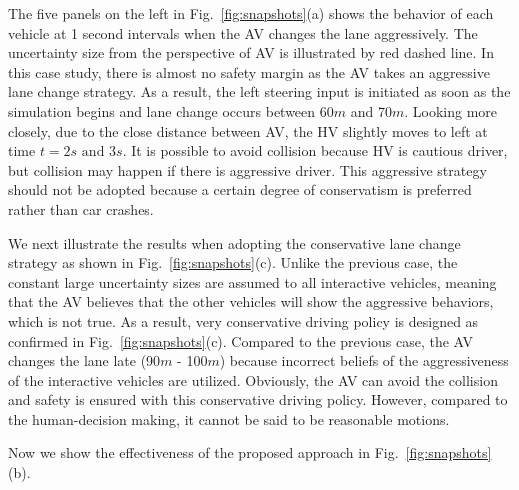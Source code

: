 \documentclass[10pt,journal]{IEEEtran}
\begin{document}
	The five panels on the left in Fig.~\ref{fig:snapshots}(a) shows the behavior of each vehicle at 1 second intervals when the AV changes the lane aggressively. The uncertainty size from the perspective of AV is illustrated by red dashed line. In this case study, there is almost no safety margin as the AV takes an aggressive lane change strategy. As a result, the left steering input is initiated as soon as the simulation begins and lane change occurs between 60$m$ and 70$m$. Looking more closely, due to the close distance between AV, the HV slightly moves to left at time $t=2s \text{ and } 3s$. It is possible to avoid collision because HV is cautious driver, but collision may happen if there is aggressive driver. This aggressive strategy should not be adopted because a certain degree of conservatism is preferred rather than car crashes.
	
	We next illustrate the results when adopting the conservative lane change strategy as shown in Fig.~\ref{fig:snapshots}(c). Unlike the previous case, the constant large uncertainty sizes are assumed to all interactive vehicles, meaning that the AV believes that the other vehicles will show the aggressive behaviors, which is not true. As a result, very conservative driving policy is designed as confirmed in Fig.~\ref{fig:snapshots}(c). Compared to the previous case, the AV changes the lane late (90$m$ - 100$m$) because incorrect beliefs of the aggressiveness of the interactive vehicles are utilized. Obviously, the AV can avoid the collision and safety is ensured with this conservative driving policy. However, compared to the human-decision making, it cannot be said to be reasonable motions.
	
	Now we show the effectiveness of the proposed approach in Fig.~\ref{fig:snapshots}(b).
	
\end{document}
